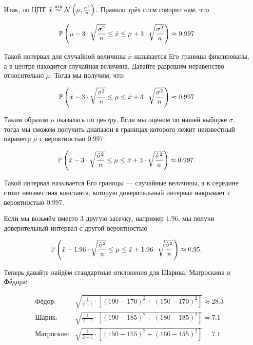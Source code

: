 \documentclass[12pt, a4paper, oneside]{article}
\begin{document}
\begin{sol} 
Итак, по ЦПТ  $\bar{x} \overset{\text{\textit{asy}}}{\sim} \mathcal{N} \left(\mu, \frac{\sigma^2}{n} \right).$ Правило трёх сигм говорит нам, что 

$$
\mathbb{P} \left( \mu - 3 \cdot \sqrt{\frac{\sigma^2}{n}}  \le \bar{x} \le \mu + 3 \cdot \sqrt{\frac{\sigma^2}{n}} \right) \approx 0.997
$$

Такой интервал для случайной величины $\bar{x}$ называется  Его границы фиксированы, а в центре находится случайная величина. Давайте разрешим неравенство относительно $\mu$. Тогда мы получим, что:

$$
\mathbb{P}\left(\bar{x}  - 3 \cdot \sqrt{\frac{\sigma^2}{n}}  \le \mu \le \bar{x}  + 3 \cdot \sqrt{\frac{\sigma^2}{n}} \right) \approx 0.997
$$

Таким образом $\mu$ оказалась по центру. Если мы оценим по нашей выборке $\sigma$, тогда мы сможем получить диапазон в границах которого лежит неизвестный параметр $\mu$ с вероятностью $0.997$:

$$
\mathbb{P}\left(\bar{x}  - 3 \cdot \sqrt{\frac{\hat{\sigma}^2}{n}}  \le \mu \le \bar{x}  + 3 \cdot \sqrt{\frac{\hat{\sigma}^2}{n}} \right) \approx 0.997.
$$

Такой интервал называется  Его границы --- случайные величины, а в середине стоит неизвестная константа, которую доверительный интервал накрывает с вероятностью $0.997$.  

Если мы возьмём вместо $3$ другую засечку, например $1.96$, мы получи доверительный интервал с другой вероятностью

$$
\mathbb{P}\left(\bar{x}  - 1.96 \cdot \sqrt{\frac{\hat{\sigma}^2}{n}}  \le \mu \le \bar{x}  + 1.96 \cdot \sqrt{\frac{\hat{\sigma}^2}{n}} \right) \approx 0.95.
$$

Теперь давайте найдём стандартные отклонения для Шарика, Матроскина и Фёдора:

\begin{equation*} 
\begin{aligned} 
& \text{Фёдор:}  & \sqrt{ \frac{1}{2-1} \cdot \left[ (190 - 170)^2 + (150 - 170)^2 \right] } \approx 28.3 \\
& \text{Шарик:}  & \sqrt{ \frac{1}{2-1} \cdot \left[ (190 - 185)^2 + (180 - 185)^2 \right] } = 7.1 \\
& \text{Матроскин:} & \sqrt{ \frac{1}{2-1} \cdot \left[ (150 - 155)^2 + (160 - 155)^2 \right] }= 7.1 \\
\end{aligned}
\end{equation*}


\end{sol}
\end{document}
